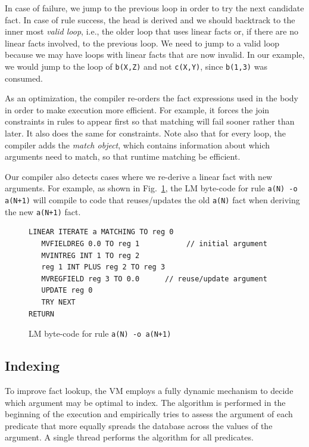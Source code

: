 \documentclass{sigplanconf}
\begin{document}
In case of failure, we jump to the previous loop in order to try the
next candidate fact. In case of rule success, the head is derived and
we should backtrack to the inner most \emph{valid loop}, i.e., the
older loop that uses linear facts or, if there are no linear facts
involved, to the previous loop. We need to jump to a valid loop
because we may have loops with linear facts that are now invalid. In
our example, we would jump to the loop of \texttt{b(X,Z)} and
not \texttt{c(X,Y)}, since \texttt{b(1,3)} was consumed.

As an optimization, the compiler re-orders the fact expressions used
in the body in order to make execution more efficient. For example, it
forces the join constraints in rules to appear first so that matching
will fail sooner rather than later. It also does the same for
constraints. Note also that for every loop, the compiler adds
the \emph{match object}, which contains information about which
arguments need to match, so that runtime matching be efficient.

Our compiler also detects cases where we re-derive a linear fact with
new arguments. For example, as shown in Fig.~\ref{code:update}, the LM
byte-code for rule \texttt{a(N) -o a(N+1)} will compile to code that
reuses/updates the old \texttt{a(N)} fact when deriving the
new \texttt{a(N+1)} fact.

\begin{figure}[ht]
{\footnotesize
\begin{Verbatim}
LINEAR ITERATE a MATCHING TO reg 0
   MVFIELDREG 0.0 TO reg 1           // initial argument
   MVINTREG INT 1 TO reg 2
   reg 1 INT PLUS reg 2 TO reg 3
   MVREGFIELD reg 3 TO 0.0      // reuse/update argument
   UPDATE reg 0
   TRY NEXT
RETURN
\end{Verbatim}
}
\caption{\small{LM byte-code for rule \texttt{a(N) -o a(N+1)}}}
\label{code:update}
\end{figure}


\subsection{Indexing}
\label{indexing}

To improve fact lookup, the VM employs a fully dynamic mechanism to
decide which argument may be optimal to index.  The algorithm is
performed in the beginning of the execution and empirically tries to
assess the argument of each predicate that more equally spreads the
database across the values of the argument.  A single thread performs
the algorithm for all predicates.
\end{document}
